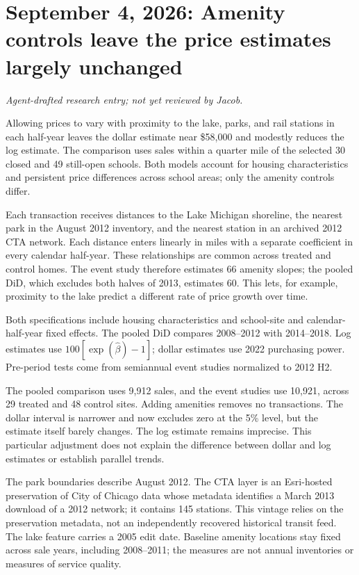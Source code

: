 \section*{September 4, 2026: Amenity controls leave the price estimates largely unchanged}
\textit{Agent-drafted research entry; not yet reviewed by Jacob.}

Allowing prices to vary with proximity to the lake, parks, and rail stations
in each half-year leaves the dollar estimate near \$58,000 and modestly
reduces the log estimate. The comparison uses sales within a quarter mile of
the selected 30 closed and 49 still-open schools. Both models account for
housing characteristics and persistent price differences across school areas;
only the amenity controls differ.

Each transaction receives distances to the Lake Michigan shoreline, the
nearest park in the August 2012 inventory, and the nearest station in an
archived 2012 CTA network. Each distance enters linearly in miles with a
separate coefficient in every calendar half-year. These relationships are
common across treated and control homes. The event study therefore estimates
66 amenity slopes; the pooled DiD, which excludes both halves of 2013,
estimates 60. This lets, for example, proximity to the lake predict a different rate of
price growth over time.

\begin{center}
\small

\end{center}
{\footnotesize Both specifications include housing characteristics and
school-site and calendar-half-year fixed effects. The pooled DiD compares
2008--2012 with 2014--2018. Log estimates use
$100[\exp(\hat\beta)-1]$; dollar estimates use 2022 purchasing power.
Pre-period tests come from semiannual event studies normalized to 2012 H2.}

The pooled comparison uses 9,912 sales, and the event studies use 10,921,
across 29 treated and 48 control sites. Adding amenities removes no
transactions. The dollar interval is narrower and now excludes zero at the
5\% level, but the estimate itself barely changes. The log estimate remains
imprecise. This particular adjustment does not explain the difference
between dollar and log estimates or establish parallel trends.

The park boundaries describe August 2012. The CTA layer is
an Esri-hosted preservation of City of Chicago data whose metadata identifies
a March 2013 download of a 2012 network; it contains 145 stations. This
vintage relies on the preservation metadata, not an independently recovered
historical transit feed. The lake feature carries a 2005 edit date. Baseline
amenity locations stay fixed across sale years, including 2008--2011; the
measures are not annual inventories or measures of service quality.

